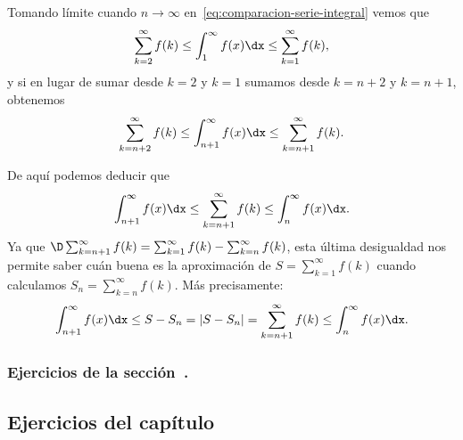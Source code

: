 \begin{remark}
  Tomando límite cuando $n\to \infty$ en~\eqref{eq:comparacion-serie-integral} vemos que
  \[
    \sum_{k=2}^\infty f(k) \le \int_1^\infty f(x)\dx \le \sum_{k=1}^{\infty} f(k),
  \]
  y si en lugar de sumar desde $k=2$ y $k=1$ sumamos desde $k=n+2$ y $k=n+1$, obtenemos
  \[
    \sum_{k=n+2}^\infty f(k) \le \int_{n+1}^\infty f(x)\dx \le \sum_{k=n+1}^{\infty} f(k).
  \]

  De aquí podemos deducir que
  \begin{equation*}
    \int_{n+1}^\infty f(x)\dx 
    \le \sum_{k=n+1}^{\infty} f(k)
    \le \int_{n}^\infty f(x)\dx.
  \end{equation*}
  Ya que $\D \sum_{k=n+1}^{\infty} f(k) = \sum_{k=1}^{\infty} f(k) - \sum_{k=n}^{\infty} f(k)$, esta última desigualdad nos permite saber cuán buena es la aproximación de $S=\sum_{k=1}^{\infty} f(k)$ cuando calculamos $S_n = \sum_{k=n}^{\infty} f(k)$.
  Más precisamente:
  \begin{equation}\label{eq:cota-cola-serie}
    \int_{n+1}^\infty f(x)\dx 
    \le S-S_n = |S-S_n| 
    = \sum_{k=n+1}^{\infty} f(k) 
    \le \int_{n}^\infty f(x)\dx.
  \end{equation}
\end{remark}

\subsubsection*{Ejercicios de la sección~.}

\begin{enumerate}
  
\end{enumerate}






%   



\subsection*{Ejercicios del capítulo~}


\begin{enumerate}
  
  
  
  
  
  
  
  
  
\end{enumerate}

